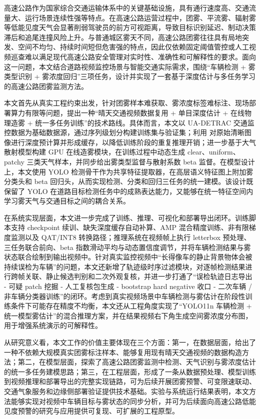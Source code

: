 高速公路作为国家综合交通运输体系中的关键基础设施，具有通行速度高、交通流量大、运行场景连续性强等特点。在高速公路运营过程中，团雾、平流雾、辐射雾等低能见度天气会显著削弱驾驶员的前方可视距离，导致目标识别延迟、制动决策滞后和追尾连撞风险上升。与普通城区雾天不同，高速公路团雾往往具有局地突发、空间不均匀、持续时间短但危害强的特点，因此仅依赖固定阈值管控或人工视频巡查难以满足现代高速公路安全管理对实时性、准确性和可解释性的要求。面向这一问题，本文结合道路视频监控场景与智能交通实际需求，围绕“车辆检测 + 雾类型识别 + 雾浓度回归”三项任务，设计并实现了一套基于深度估计与多任务学习的高速公路团雾监测方法。

本文首先从真实工程约束出发，针对团雾样本难获取、雾浓度标签难标注、现场部署算力有限等问题，提出一种“晴天交通视频数据复用 + 单目深度估计 + 在线物理造雾 + 统一多任务训练”的技术路线。具体而言，本文以 UA-DETRAC 交通监控数据为基础数据源，通过序列级划分构建训练集与验证集；利用  对原始清晰图像进行深度预计算并形成缓存，以降低训练阶段的重复推理开销；进一步基于大气散射模型构建 GPU 在线造雾模块，在训练过程中动态生成 clear、uniform、patchy 三类天气样本，并同步给出雾类型监督与散射系数 beta 监督。在模型设计上，本文使用 YOLO 检测骨干作为共享特征提取器，在高层语义特征图上附加雾分类头和 beta 回归头，从而实现检测、分类和回归三任务的统一建模。该设计既保留了 YOLO 在道路目标检测任务中的成熟表达能力，又能够在统一特征空间内学习雾天气与交通目标之间的耦合关系。

在系统实现层面，本文进一步完成了训练、推理、可视化和部署导出闭环。训练脚本支持 checkpoint 续训、缺失深度缓存自动补算、AMP 混合精度训练、非有限梯度监测以及 QAT/INT8 转换路径；推理系统在视频帧上执行 letterbox 预处理、三任务联合前向、beta 指数滑动平均与动态置信度调节，并将车辆检测结果与雾状态联合绘制到输出视频中。针对真实监控视频中“长得像车的静止背景物体会被持续误检为车辆”的问题，本文还新增了轨迹级时序过滤模块，对逐帧检测结果进行跨帧关联、静止候选判别和二次外观复核，并进一步打通了“误检轨迹日志导出 - 可疑 patch 挖掘 - 人工复核包生成 - bootstrap hard negative 收口 - 二次车辆 / 非车辆分类器训练”的闭环。考虑到真实视频场景中车辆检测与雾估计在阶段性训练条件下可能存在精度不均衡，本文还从工程角度实现了“YOLO11n 车辆检测 + 统一模型雾估计”的混合推理方案，并在结果视频右下角生成空间雾浓度分布图，用于增强系统演示的可解释性。

从研究意义看，本文工作的价值主要体现在三个方面：第一，在数据层面，给出了一种不依赖大规模真实团雾标注样本、能够复用现有晴天交通视频的数据构造方法；第二，在模型层面，探索了高速公路团雾监测中检测、天气识别与雾浓度估计的统一多任务建模思路；第三，在工程层面，形成了一条从数据预处理、模型训练到视频推理和部署导出的完整实现链路，可为后续开展团雾预警、可变限速联动、交通气象服务和边缘侧部署验证提供技术基础。实验与系统运行结果表明，本文方法能够实现对视频中车辆目标与雾状态的同步分析，并可为后续面向高速公路低能见度预警的研究与应用提供可复现、可扩展的工程原型。
